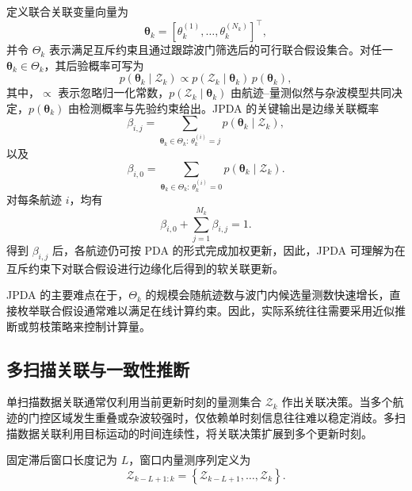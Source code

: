 \documentclass{xdupgthesis}
\begin{document}
定义联合关联变量向量为
\begin{equation}
	\boldsymbol{\theta}_k
	=
	\left[
	\theta_k^{(1)},\ldots,\theta_k^{(N_k)}
	\right]^\top,
\end{equation}
并令 $\Theta_k$ 表示满足互斥约束且通过跟踪波门筛选后的可行联合假设集合。对任一 $\boldsymbol{\theta}_k\in\Theta_k$，其后验概率可写为
\begin{equation}
	p(\boldsymbol{\theta}_k\mid \mathcal{Z}_k)
	\propto
	p(\mathcal{Z}_k\mid \boldsymbol{\theta}_k)\,p(\boldsymbol{\theta}_k),
\end{equation}
其中，$\propto$ 表示忽略归一化常数，$p(\mathcal{Z}_k\mid \boldsymbol{\theta}_k)$ 由航迹--量测似然与杂波模型共同决定，$p(\boldsymbol{\theta}_k)$ 由检测概率与先验约束给出。JPDA 的关键输出是边缘关联概率
\begin{equation}
	\beta_{i,j}
	=
	\sum_{\boldsymbol{\theta}_k\in\Theta_k:\,\theta_k^{(i)}=j}
	p(\boldsymbol{\theta}_k\mid \mathcal{Z}_k),
\end{equation}
以及
\begin{equation}
	\beta_{i,0}
	=
	\sum_{\boldsymbol{\theta}_k\in\Theta_k:\,\theta_k^{(i)}=0}
	p(\boldsymbol{\theta}_k\mid \mathcal{Z}_k).
\end{equation}
对每条航迹 $i$，均有
\begin{equation}
	\beta_{i,0}+\sum_{j=1}^{M_k}\beta_{i,j}=1.
\end{equation}
得到 $\beta_{i,j}$ 后，各航迹仍可按 PDA 的形式完成加权更新，因此，JPDA 可理解为在互斥约束下对联合假设进行边缘化后得到的软关联更新。

JPDA 的主要难点在于，$\Theta_k$ 的规模会随航迹数与波门内候选量测数快速增长，直接枚举联合假设通常难以满足在线计算约束。因此，实际系统往往需要采用近似推断或剪枝策略来控制计算量。

\subsection{多扫描关联与一致性推断}

单扫描数据关联通常仅利用当前更新时刻的量测集合 $\mathcal{Z}_k$ 作出关联决策。当多个航迹的门控区域发生重叠或杂波较强时，仅依赖单时刻信息往往难以稳定消歧。多扫描数据关联利用目标运动的时间连续性，将关联决策扩展到多个更新时刻。

固定滞后窗口长度记为 $L$，窗口内量测序列定义为
\begin{equation}
	\mathcal{Z}_{k-L+1:k}
	=
	\left\{
	\mathcal{Z}_{k-L+1},\ldots,\mathcal{Z}_k
	\right\}.
\end{equation}
\end{document}
